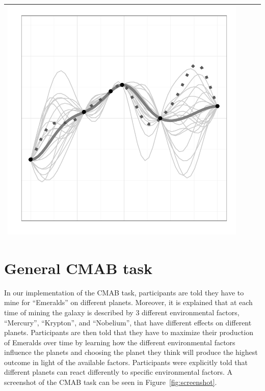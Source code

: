 \documentclass[a4paper,natbib]{apa6}
\begin{document}
\begin{table}[h!]
\begin{tabular}{lccc}
\includegraphics[scale=0.2]{figure20.pdf} \\ \hline
\end{tabular}
\end{table}


\section{General CMAB task}

In our implementation of the CMAB task, participants are told they have to mine for ``Emeralds'' on different planets. Moreover, it is explained that at each time of mining the galaxy is described by 3 different environmental factors, ``Mercury'', ``Krypton'', and ``Nobelium'', that have different effects on different planets. Participants are then told that they have to maximize their production of Emeralds over time by learning how the different environmental factors influence the planets and choosing the planet they think will produce the highest outcome in light of the available factors. Participants were explicitly told that different planets can react differently to specific environmental factors. A screenshot of the CMAB task can be seen in Figure~\ref{fig:screenshot}.
\end{document}

